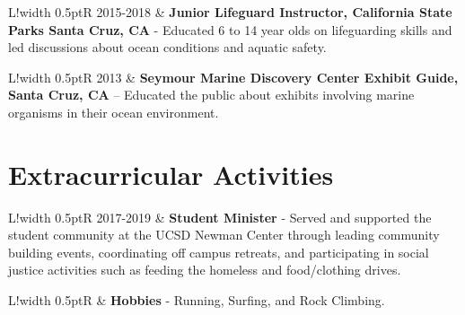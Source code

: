 \documentclass[10pt]{article}
\newcommand\VRule{\color{lightgray}\vrule width 0.5pt}
\begin{document}
\begin{tabular}{L!{\VRule}R}
2015-2018 & \textbf{Junior Lifeguard Instructor, California State Parks Santa Cruz, CA } - Educated 6 to 14 year olds on lifeguarding skills and led discussions about ocean conditions and aquatic safety. \\[5pt]
\end{tabular}
\newline \noindent
\newline \noindent 
\newline \noindent
\begin{tabular}{L!{\VRule}R}
2013 & \textbf{Seymour Marine Discovery Center Exhibit Guide, Santa Cruz, CA} -- Educated the public about exhibits involving marine organisms in their ocean environment.\\[5pt] 
\end{tabular}

\vspace{.3cm}
\section*{Extracurricular Activities}
\vspace{.3cm}
\begin{tabular}{L!{\VRule}R}
2017-2019 & \textbf{Student Minister} - Served and supported the student community at the UCSD Newman Center through leading community building events, coordinating off campus retreats, and participating in social justice activities such as feeding the homeless and food/clothing drives.  \\[5pt]
\end{tabular} 
\newline \noindent
\newline \noindent 
\newline \noindent
\begin{tabular}{L!{\VRule}R}
& \textbf{Hobbies} - Running, Surfing, and Rock Climbing.  \\[5pt]
\end{tabular}

\vspace{.3cm}
\end{document}

